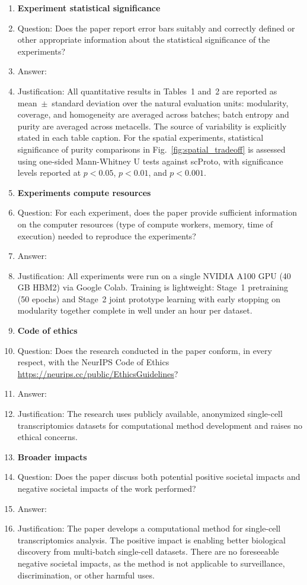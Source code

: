 \begin{enumerate}
\item {\bf Experiment statistical significance}
    \item[] Question: Does the paper report error bars suitably and correctly defined or other appropriate information about the statistical significance of the experiments?
    \item[] Answer: \answerYes{}
    \item[] Justification: All quantitative results in Tables~1 and~2 are reported as mean~$\pm$~standard deviation over the natural evaluation units: modularity, coverage, and homogeneity are averaged across batches; batch entropy and purity are averaged across metacells. The source of variability is explicitly stated in each table caption. For the spatial experiments, statistical significance of purity comparisons in Fig.~\ref{fig:spatial_tradeoff} is assessed using one-sided Mann-Whitney U tests against scProto, with significance levels reported at $p{<}0.05$, $p{<}0.01$, and $p{<}0.001$.

\item {\bf Experiments compute resources}
    \item[] Question: For each experiment, does the paper provide sufficient information on the computer resources (type of compute workers, memory, time of execution) needed to reproduce the experiments?
    \item[] Answer: \answerYes{}
    \item[] Justification: All experiments were run on a single NVIDIA A100 GPU (40\,GB HBM2) via Google Colab. Training is lightweight: Stage~1 pretraining (50 epochs) and Stage~2 joint prototype learning with early stopping on modularity together complete in well under an hour per dataset.

\item {\bf Code of ethics}
    \item[] Question: Does the research conducted in the paper conform, in every respect, with the NeurIPS Code of Ethics \url{https://neurips.cc/public/EthicsGuidelines}?
    \item[] Answer: \answerYes{}
    \item[] Justification: The research uses publicly available, anonymized single-cell transcriptomics datasets for computational method development and raises no ethical concerns.

\item {\bf Broader impacts}
    \item[] Question: Does the paper discuss both potential positive societal impacts and negative societal impacts of the work performed?
    \item[] Answer: \answerNA{}
    \item[] Justification: The paper develops a computational method for single-cell transcriptomics analysis. The positive impact is enabling better biological discovery from multi-batch single-cell datasets. There are no foreseeable negative societal impacts, as the method is not applicable to surveillance, discrimination, or other harmful uses.


\end{enumerate}
